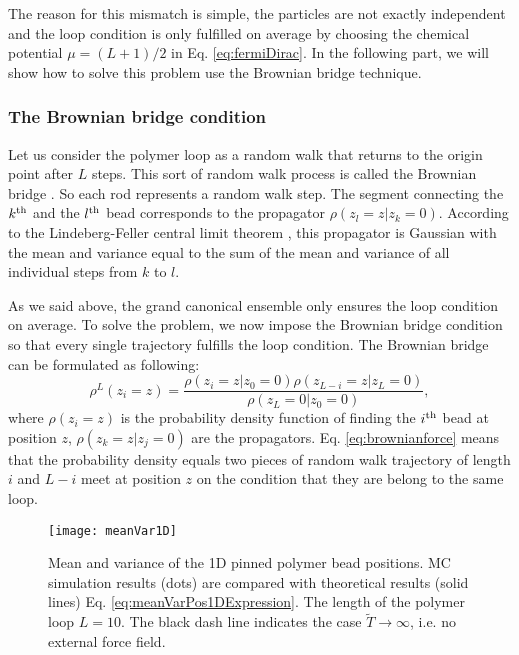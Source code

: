 The reason for this mismatch is simple, the particles are not exactly independent and the loop condition is only fulfilled on average by choosing the chemical potential $\mu=(L+1)/2$ in Eq. \eqref{eq:fermiDirac}. In the following part, we will show how to solve this problem use the Brownian bridge technique. 

\subsubsection{The Brownian bridge condition}
\label{ssub:The Brownian Bridge Condition}
Let us consider the polymer loop as a random walk that returns to the origin point after $L$ steps. This sort of random walk process is called the Brownian bridge \cite{Feller2008,Athreya2006}. So each rod represents a random walk step. The segment connecting the $k^{\rm{th}}$ and the $l^{\rm{th}}$ bead corresponds to the propagator $\rho(z_l = z | z_k=0)$. According to the Lindeberg-Feller central limit theorem \cite{Feller2008}, this propagator is Gaussian with the mean and variance equal to the sum of the mean and variance of all individual steps from $k$ to $l$.

As we said above, the grand canonical ensemble only ensures the loop condition on average. To solve the problem, we now impose the Brownian bridge condition so that every single trajectory fulfills the loop condition. The Brownian bridge can be formulated as following:
\begin{equation}
    \label{eq:brownianBridge}
    \rho^L(z_i=z) = \frac{\rho(z_i=z|z_0=0)\rho(z_{L-i}=z|z_L=0)}{\rho(z_L=0|z_0=0)},
\end{equation}
where $\rho(z_i=z)$ is the probability density function of finding the $i^{\rm{th}}$ bead at position $z$, $\rho(z_k=z|z_j=0)$ are the propagators. Eq. \eqref{eq:brownianforce} means that the probability density equals two pieces of random walk trajectory of length $i$ and $L-i$ meet at position $z$ on the condition that they are belong to the same loop. 
\begin{figure}[htpb]
    \centering
    \texttt{[image: meanVar1D]}
    \caption{Mean and variance of the 1D pinned polymer bead positions. MC simulation results (dots) are compared with theoretical results (solid lines) Eq. \ref{eq:meanVarPos1DExpression}. The length of the polymer loop $L=10$. The black dash line indicates the case $\tilde{T}\rightarrow\infty$, i.e. no external force field. }
    \label{fig:meanVar1D}
\end{figure}

